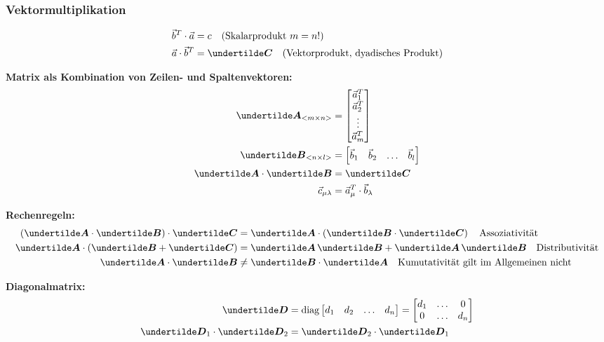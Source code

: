 \subsubsection{Vektormultiplikation}
\begin{align*}
\vec{b}^T\cdot \vec{a} &= c \quad \text{(Skalarprodukt $m=n$!)}\\
\vec{a} \cdot \vec{b}^T &= \ma{C} \quad \text{(Vektorprodukt, dyadisches Produkt)}
\end{align*}

\textbf{Matrix als Kombination von Zeilen- und Spaltenvektoren:}
\begin{align*}
\ma{A}_{<m\times n>} &= \begin{bmatrix} \vec{a}_1^T \\ \vec{a}_2^T \\ \vdots \\ \vec{a}_m^T \end{bmatrix}\\
\ma{B}_{<n\times l>} &= \begin{bmatrix} \vec{b}_1 & \vec{b}_2 & \ldots & \vec{b}_l \end{bmatrix}\\
\ma{A} \cdot \ma{B} &= \ma{C}\\
\vec{c}_{\mu\lambda} &= \vec{a}_\mu^T \cdot \vec{b}_\lambda
\end{align*}

\textbf{Rechenregeln:}
\begin{align*}
\left(\ma{A}\cdot \ma{B}\right)\cdot \ma{C} &= \ma{A} \cdot \left(\ma{B} \cdot \ma{C}\right) \quad \text{Assoziativität}\\
\ma{A} \cdot \left(\ma{B} + \ma{C}\right) &= \ma{A}\,\ma{B} + \ma{A}\,\ma{B} \quad \text{Distributivität}\\
\ma{A} \cdot \ma{B} &\neq \ma{B} \cdot \ma{A} \quad \text{Kumutativität gilt im Allgemeinen nicht}
\end{align*}

\textbf{Diagonalmatrix:}
\begin{align*}
\ma{D} &= \text{diag}\begin{bmatrix}d_1 & d_2 & \ldots & d_n\end{bmatrix} = \begin{bmatrix}d_1 & \ldots & 0 \\ 0 & \ldots & d_n\end{bmatrix}\\
\ma{D}_1 \cdot \ma{D}_2 &= \ma{D}_2 \cdot \ma{D}_1
\end{align*}

